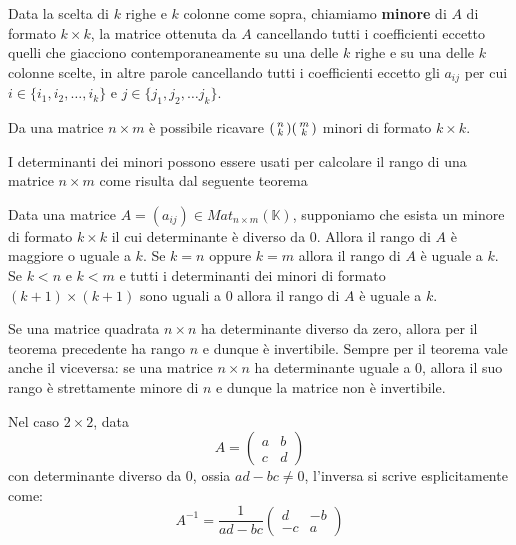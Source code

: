 \begin{defn}
	Data la scelta di $k$ righe e $k$ colonne come sopra, chiamiamo
	\textbf{minore} di $A$ di formato $k \times k$, la matrice ottenuta da $A$
	cancellando tutti i coefficienti eccetto quelli che giacciono
	contemporaneamente su una delle $k$ righe e su una delle $k$ colonne scelte,
	in altre parole cancellando tutti i coefficienti eccetto gli $a_{ij}$ per
	cui $i \in \{i_1, i_2, \dots, i_k\}$ e $j \in \{j_1, j_2, \dots j_k\}$.
\end{defn}

\begin{observation}
	Da una matrice $n \times m$ \`e possibile ricavare $\begin{psmallmatrix}
			n \\ k \end{psmallmatrix} \begin{psmallmatrix}
			m \\ k \end{psmallmatrix}$ minori di formato $k \times k$.
\end{observation}

I determinanti dei minori possono essere usati per calcolare il rango di una
matrice $n \times m$ come risulta dal seguente teorema

\begin{theorem}
	Data una matrice $A = (a_{ij}) \in Mat_{n \times m}(\mathbb{K})$, supponiamo
	che esista un minore di formato $k \times k$ il cui determinante \`e diverso
	da 0. Allora il rango di $A$ \`e maggiore o uguale a $k$. Se $k = n$ oppure
	$k = m$ allora il rango di $A$ \`e uguale a $k$. Se $k < n$ e $k < m$ e tutti
	i determinanti dei minori di formato $(k + 1) \times (k + 1)$ sono uguali a 0
	allora il rango di $A$ \`e uguale a $k$.
\end{theorem}

\begin{observation}
	Se una matrice quadrata $n \times n$ ha determinante diverso da zero, allora
	per il teorema precedente ha rango $n$ e dunque \`e invertibile. Sempre per il
	teorema vale anche il viceversa: se una matrice $n \times n$ ha determinante
	uguale a 0, allora il suo rango \`e strettamente minore di $n$ e dunque la
	matrice non \`e invertibile.

	Nel caso $2 \times 2$, data
	\begin{equation*}
		A = \begin{pmatrix}
			a & b \\
			c & d
		\end{pmatrix}
	\end{equation*}
	con determinante diverso da 0, ossia $ad - bc \neq 0$, l'inversa si scrive
	esplicitamente come:
	\begin{equation*}
		A^{-1} = \frac{1}{ad - bc} \begin{pmatrix}
			d  & -b \\
			-c & a
		\end{pmatrix}
	\end{equation*}
\end{observation}

